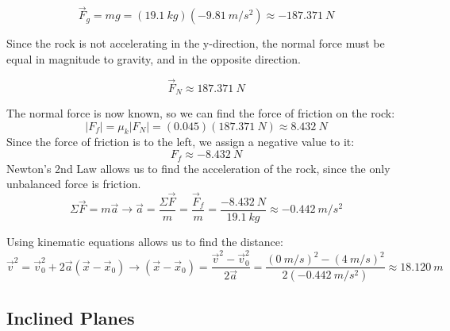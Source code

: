 \begin{mdframed}[backgroundcolor=blue!10!white]
			\begin{equation*}
			\vec{F}_g = m g = (\SI{19.1}{kg})(\SI{-9.81}{m/s^2}) \approx \SI{-187.371}{N}
			\end{equation*}
		
			Since the rock is not accelerating in the y-direction, the normal force must be equal in magnitude to gravity, and in the opposite direction.
			
			\begin{equation*}
			\vec{F}_N \approx \SI{187.371}{N}
			\end{equation*}
			
			The normal force is now known, so we can find the force of friction on the rock:
			\begin{equation*}
			|F_f| = \mu_k |F_N|   = (0.045)( \SI{187.371}{N}) \approx \SI{8.432}{N} 
			\end{equation*}
			Since the force of friction is to the left, we assign a negative value to it:
				\begin{equation*}
			F_f \approx \SI{-8.432}{N} 
			\end{equation*}
			Newton's 2nd Law allows us to find the acceleration of the rock, since the only unbalanced force is friction.
			\begin{equation*}
			\Sigma \vec{F} = m \vec{a} \longrightarrow \vec{a} = \frac{\Sigma \vec{F}}{m} = \frac{\vec{F}_f}{m} =  \frac{\SI{-8.432}{N}}{\SI{19.1}{kg}} \approx \SI{-0.442}{m/s^2}
			\end{equation*}
			
			Using kinematic equations allows us to find the distance:
			\begin{equation*}
			\vec{v}^2 = \vec{v}_0^2 + 2 \vec{a}(\vec{x}-\vec{x}_0) \longrightarrow  (\vec{x}-\vec{x}_0) = \frac{\vec{v}^2 - \vec{v}_0^2}{2 \vec{a}} = \frac{(\SI{0}{m/s})^2 - (\SI{4}{m/s})^2}{2 (\SI{-0.442}{m/s^2})} \approx \SI{18.120}{m}
			\end{equation*}
			
			
		\end{mdframed}	
		
		\subsection{Inclined Planes}
		
